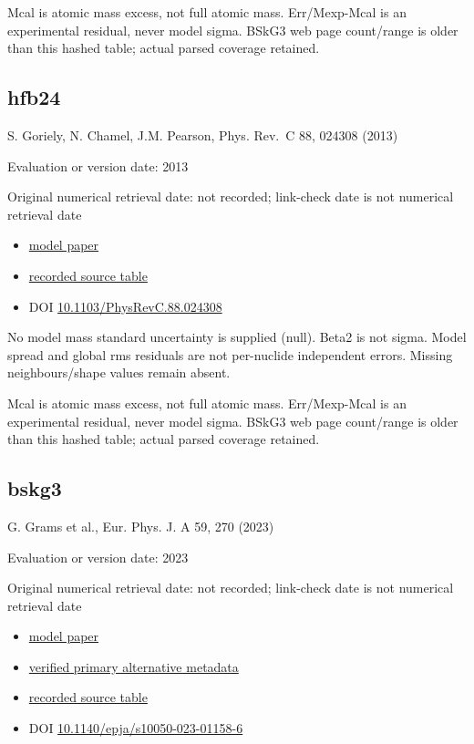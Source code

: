 \documentclass[
  11pt,
  letterpaper,
]{article}
\providecommand{\tightlist}{%
  \setlength{\itemsep}{0pt}\setlength{\parskip}{0pt}}
\begin{document}
Mcal is atomic mass excess, not full atomic mass. Err/Mexp-Mcal is an
experimental residual, never model sigma. BSkG3 web page count/range is
older than this hashed table; actual parsed coverage retained.

\subsection{hfb24}\label{hfb24}

S. Goriely, N. Chamel, J.M. Pearson, Phys. Rev.~C 88, 024308 (2013)

Evaluation or version date: 2013

Original numerical retrieval date: not recorded; link-check date is not
numerical retrieval date

\begin{itemize}
\tightlist
\item
  \href{https://doi.org/10.1103/PhysRevC.88.024308}{model paper}
\item
  \href{https://www.astro.ulb.ac.be/bruslib/nucdata/hfb24-dat}{recorded
  source table}
\item
  DOI
  \href{https://doi.org/10.1103/PhysRevC.88.024308}{10.1103/PhysRevC.88.024308}
\end{itemize}

No model mass standard uncertainty is supplied (null). Beta2 is not
sigma. Model spread and global rms residuals are not per-nuclide
independent errors. Missing neighbours/shape values remain absent.

Mcal is atomic mass excess, not full atomic mass. Err/Mexp-Mcal is an
experimental residual, never model sigma. BSkG3 web page count/range is
older than this hashed table; actual parsed coverage retained.

\subsection{bskg3}\label{bskg3}

G. Grams et al., Eur. Phys. J. A 59, 270 (2023)

Evaluation or version date: 2023

Original numerical retrieval date: not recorded; link-check date is not
numerical retrieval date

\begin{itemize}
\tightlist
\item
  \href{https://doi.org/10.1140/epja/s10050-023-01158-6}{model paper}
\item
  \href{https://arxiv.org/abs/2307.14276}{verified primary alternative
  metadata}
\item
  \href{https://www.astro.ulb.ac.be/bruslib/nucdata/bskg03-dat}{recorded
  source table}
\item
  DOI
  \href{https://doi.org/10.1140/epja/s10050-023-01158-6}{10.1140/epja/s10050-023-01158-6}
\end{itemize}
\end{document}
